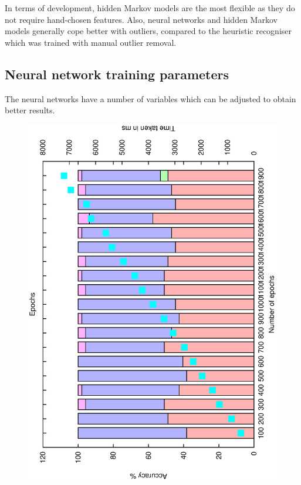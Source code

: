 \documentclass[12pt,a4,notitlepage]{report}
\renewcommand{\_}{\texttt{\symbol{95}}}
\newcommand{\<}{\texttt{\symbol{60}}}
\renewcommand{\>}{\texttt{\symbol{62}}}
\begin{document}
In terms of development, hidden Markov models are the most flexible as they do not require hand-chosen features. Also, neural networks and hidden Markov models generally cope better with outliers, compared to the heuristic recogniser which was trained with manual outlier removal.

\subsection{Neural network training parameters}

The neural networks have a number of variables which can be adjusted to obtain better results. 

\begin{figure}
\centering
\includegraphics[scale=0.3,angle=-90]{results/neural/n_epochs.ps}

\end{figure}
\end{document}
